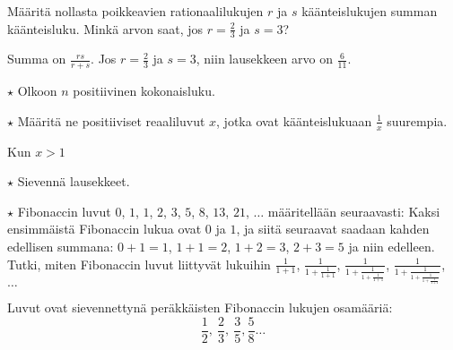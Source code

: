 \begin{tehtavasivu}
\begin{tehtava}
	Määritä nollasta poikkeavien rationaalilukujen $r$ ja $s$ käänteislukujen summan käänteisluku. Minkä arvon saat, jos $r=\frac{2}{3}$ ja $s=3$?
	\begin{vastaus}
		Summa on $\frac{rs}{r+s}$. Jos $r=\frac{2}{3}$ ja $s=3$, niin lausekkeen arvo on $\frac{6}{11}$.
	\end{vastaus}
\end{tehtava}

\begin{tehtava} $\star$ Olkoon $n$ positiivinen kokonaisluku.
	\begin{vastaus}
	\end{vastaus}
\end{tehtava}

\begin{tehtava} $\star$
	Määritä ne positiiviset reaaliluvut $x$, jotka ovat käänteislukuaan $\frac{1}{x}$ suurempia.
	\begin{vastaus}
	 Kun $x>1$
	\end{vastaus}
\end{tehtava}

\begin{tehtava} $\star $
Sievennä lausekkeet.
 \begin{vastaus}
	\alakohdatm{
		§ $a+1$
		§ $4a$
	}
 \end{vastaus}
\end{tehtava}

\begin{tehtava}
	$\star$ Fibonaccin luvut $0$, $1$, $1$, $2$, $3$, $5$, $8$, $13$, $21$, $\ldots$ määritellään seuraavasti: Kaksi ensimmäistä Fibonaccin lukua ovat $0$ ja $1$, ja siitä seuraavat saadaan kahden edellisen summana: $0+1=1$, $1+1=2$, $1+2 = 3$, $2+3=5 $ ja niin edelleen. Tutki, miten Fibonaccin luvut liittyvät lukuihin
	$ \frac{1}{1+1}$, $\frac{1}{1+\frac{1}{1+1}}$, 
	$\frac{1}{1+\frac{1}{1+\frac{1}{1+1}}}$, 
	$\frac{1}{1+\frac{1}{1+\frac{1}{1+\frac{1}{1+1}}}}$, $\ldots\ $
	\begin{vastaus}
		Luvut ovat sievennettynä peräkkäisten Fibonaccin lukujen osamääriä:
		\[\frac{1}{2}, \ \frac{2}{3}, \ \frac{3}{5}, \frac{5}{8} \ldots  \]
	\end{vastaus}
\end{tehtava}


\end{tehtavasivu}
